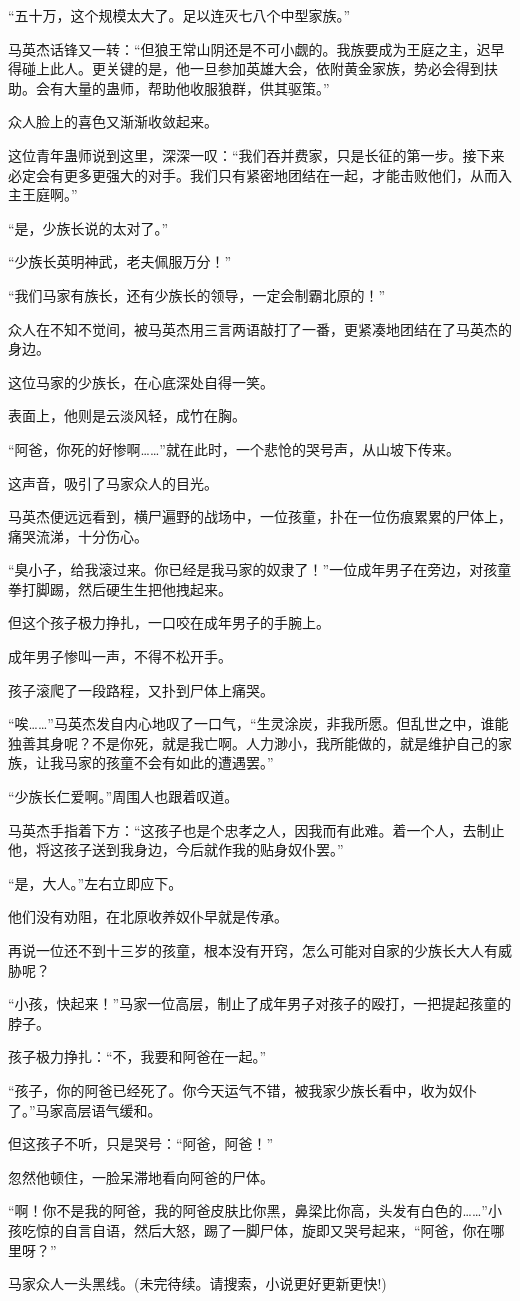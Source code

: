 \begin{this_body}
“五十万，这个规模太大了。足以连灭七八个中型家族。”

马英杰话锋又一转：“但狼王常山阴还是不可小觑的。我族要成为王庭之主，迟早得碰上此人。更关键的是，他一旦参加英雄大会，依附黄金家族，势必会得到扶助。会有大量的蛊师，帮助他收服狼群，供其驱策。”

众人脸上的喜色又渐渐收敛起来。

这位青年蛊师说到这里，深深一叹：“我们吞并费家，只是长征的第一步。接下来必定会有更多更强大的对手。我们只有紧密地团结在一起，才能击败他们，从而入主王庭啊。”

“是，少族长说的太对了。”

“少族长英明神武，老夫佩服万分！”

“我们马家有族长，还有少族长的领导，一定会制霸北原的！”

众人在不知不觉间，被马英杰用三言两语敲打了一番，更紧凑地团结在了马英杰的身边。

这位马家的少族长，在心底深处自得一笑。

表面上，他则是云淡风轻，成竹在胸。

“阿爸，你死的好惨啊……”就在此时，一个悲怆的哭号声，从山坡下传来。

这声音，吸引了马家众人的目光。

马英杰便远远看到，横尸遍野的战场中，一位孩童，扑在一位伤痕累累的尸体上，痛哭流涕，十分伤心。

“臭小子，给我滚过来。你已经是我马家的奴隶了！”一位成年男子在旁边，对孩童拳打脚踢，然后硬生生把他拽起来。

但这个孩子极力挣扎，一口咬在成年男子的手腕上。

成年男子惨叫一声，不得不松开手。

孩子滚爬了一段路程，又扑到尸体上痛哭。

“唉……”马英杰发自内心地叹了一口气，“生灵涂炭，非我所愿。但乱世之中，谁能独善其身呢？不是你死，就是我亡啊。人力渺小，我所能做的，就是维护自己的家族，让我马家的孩童不会有如此的遭遇罢。”

“少族长仁爱啊。”周围人也跟着叹道。

马英杰手指着下方：“这孩子也是个忠孝之人，因我而有此难。着一个人，去制止他，将这孩子送到我身边，今后就作我的贴身奴仆罢。”

“是，大人。”左右立即应下。

他们没有劝阻，在北原收养奴仆早就是传承。

再说一位还不到十三岁的孩童，根本没有开窍，怎么可能对自家的少族长大人有威胁呢？

“小孩，快起来！”马家一位高层，制止了成年男子对孩子的殴打，一把提起孩童的脖子。

孩子极力挣扎：“不，我要和阿爸在一起。”

“孩子，你的阿爸已经死了。你今天运气不错，被我家少族长看中，收为奴仆了。”马家高层语气缓和。

但这孩子不听，只是哭号：“阿爸，阿爸！”

忽然他顿住，一脸呆滞地看向阿爸的尸体。

“啊！你不是我的阿爸，我的阿爸皮肤比你黑，鼻梁比你高，头发有白色的……”小孩吃惊的自言自语，然后大怒，踢了一脚尸体，旋即又哭号起来，“阿爸，你在哪里呀？”

马家众人一头黑线。(未完待续。请搜索，小说更好更新更快!)

\end{this_body}

